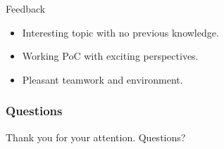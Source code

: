 \begin{frame}{Feedback}

\begin{exampleblock}{}
\begin{itemize}

\item Interesting topic with no previous knowledge.

\item Working PoC with exciting perspectives.

\item Pleasant teamwork and environment.

\end{itemize}
\end{exampleblock}

\end{frame}


\begin{frame}
	\frametitle{Questions}
	\begin{center}
		Thank you for your attention. Questions?
	\end{center}
\end{frame}


